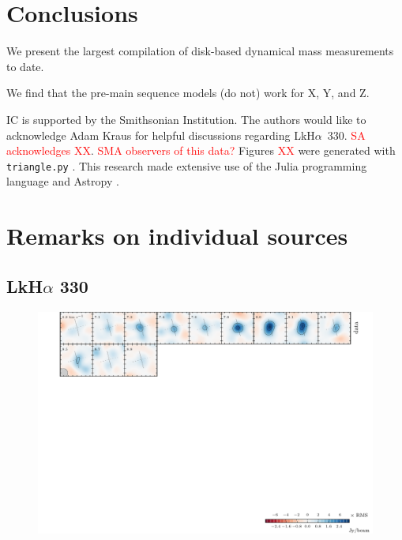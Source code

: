 \documentclass[twocolumn]{aastex6}
\newcommand{\todo}[1]{ \textcolor{red}{#1}}
\begin{document}
\section{Conclusions}

We present the largest compilation of disk-based dynamical mass measurements to date.

We find that the pre-main sequence models (do not) work for X, Y, and Z.

\acknowledgments
IC is supported by the Smithsonian Institution. The authors would like to acknowledge Adam Kraus for helpful discussions regarding LkH$\alpha$~330. \todo{SA acknowledges XX}. \todo{SMA observers of this data?}  Figures \todo{XX} were generated with \texttt{triangle.py} \citep{foreman-mackey14}. This research made extensive use of the Julia programming language \citep{julia12} and Astropy \citep{astropy13}.




\appendix

\section{Remarks on individual sources}

\subsection{LkH$\alpha$ 330}
\begin{figure}[htb]
\begin{center}
  \includegraphics{LkHa330.pdf}
  \end{center}
\end{figure}
\end{document}
